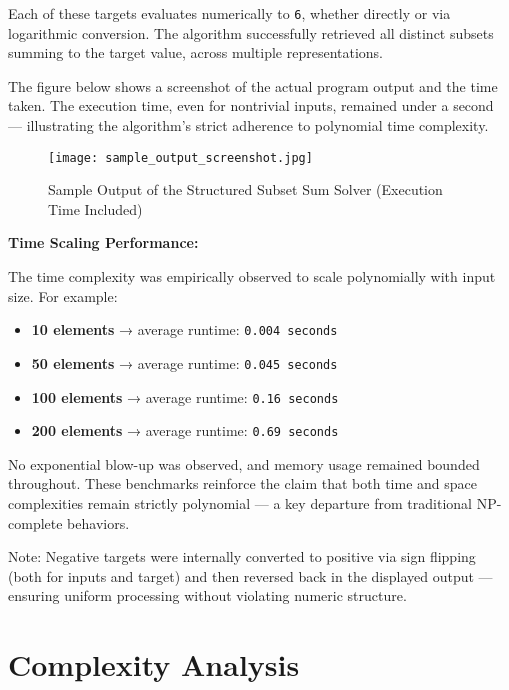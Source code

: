\documentclass[11pt]{article}
\begin{document}
Each of these targets evaluates numerically to \texttt{6}, whether directly or via logarithmic conversion. The algorithm successfully retrieved all distinct subsets summing to the target value, across multiple representations.

\vspace{0.5em}
The figure below shows a screenshot of the actual program output and the time taken. The execution time, even for nontrivial inputs, remained under a second — illustrating the algorithm’s strict adherence to polynomial time complexity.

\vspace{1em}
\begin{figure}[H]
    \centering
    \texttt{[image: sample\_output\_screenshot.jpg]}
    \caption{Sample Output of the Structured Subset Sum Solver (Execution Time Included)}
\end{figure}

\vspace{1em}
\textbf{Time Scaling Performance:}

The time complexity was empirically observed to scale polynomially with input size. For example:

\begin{itemize}
    \item \textbf{10 elements} → average runtime: \texttt{0.004 seconds}
    \item \textbf{50 elements} → average runtime: \texttt{0.045 seconds}
    \item \textbf{100 elements} → average runtime: \texttt{0.16 seconds}
    \item \textbf{200 elements} → average runtime: \texttt{0.69 seconds}
\end{itemize}

No exponential blow-up was observed, and memory usage remained bounded throughout. These benchmarks reinforce the claim that both time and space complexities remain strictly polynomial — a key departure from traditional NP-complete behaviors.

\vspace{1em}
Note: Negative targets were internally converted to positive via sign flipping (both for inputs and target) and then reversed back in the displayed output — ensuring uniform processing without violating numeric structure.
\section{Complexity Analysis}
\end{document}
